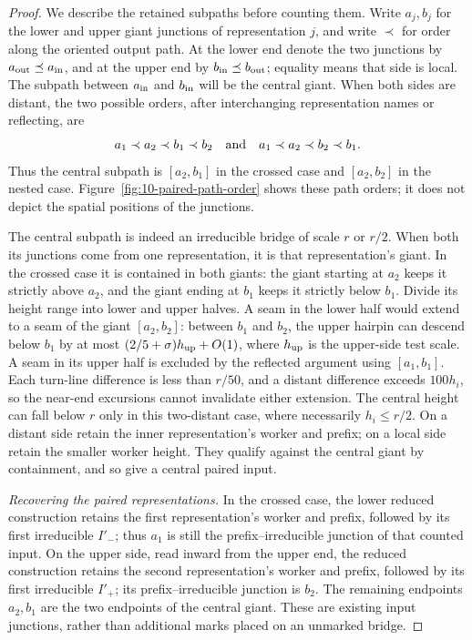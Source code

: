 \begin{proof}
We describe the retained subpaths before counting them. Write
\(a_j,b_j\) for the lower and upper giant junctions of representation
\(j\), and write \(\prec\) for order along the oriented output path.
At the lower end denote the two junctions by
\(a_{\rm out}\preceq a_{\rm in}\), and at the upper end by
\(b_{\rm in}\preceq b_{\rm out}\); equality means that side is local.
The subpath between \(a_{\rm in}\) and \(b_{\rm in}\) will be the
central giant. When both sides are distant, the two possible orders,
after interchanging representation names or reflecting, are
\[
 a_1\prec a_2\prec b_1\prec b_2
 \quad\hbox{and}\quad
 a_1\prec a_2\prec b_2\prec b_1.
\]
Thus the central subpath is \([a_2,b_1]\) in the crossed case and
\([a_2,b_2]\) in the nested case. Figure~\ref{fig:10-paired-path-order}
shows these path orders; it does not depict the spatial positions of
the junctions.


The central subpath is indeed an irreducible bridge of scale \(r\) or
\(r/2\). When both its junctions come from one representation, it is
that representation's giant. In the crossed case it is contained in
both giants: the giant starting at \(a_2\) keeps it strictly above
\(a_2\), and the giant ending at \(b_1\) keeps it strictly below
\(b_1\). Divide its height range into lower and upper halves.
A seam in the lower half would extend to a seam of the
giant \([a_2,b_2]\): between \(b_1\) and \(b_2\), the upper
hairpin can descend below \(b_1\) by at most
\((2/5+\sigma)h_{\rm up}+O(1)\), where \(h_{\rm up}\) is the
upper-side test scale. A seam in its upper half is
excluded by the reflected argument using \([a_1,b_1]\). Each turn-line
difference is less than \(r/50\), and a distant difference exceeds
\(100h_i\), so the near-end excursions cannot invalidate either
extension. The central height can fall below \(r\) only in this
two-distant case, where necessarily \(h_i\le r/2\). On a distant
side retain the inner representation's worker and prefix; on a local
side retain the smaller worker height. They qualify against the central
giant by containment, and so give a central paired input.

\smallskip\noindent\emph{Recovering the paired representations.}
In the crossed case, the lower reduced construction retains the first
representation's worker and prefix, followed by its first irreducible \(I'_-\); thus
\(a_1\) is still the prefix--irreducible junction of that counted
input. On the upper side, read inward from the upper end, the reduced
construction retains the second representation's worker and prefix,
followed by its first irreducible \(I'_+\); its prefix--irreducible
junction is \(b_2\). The remaining endpoints \(a_2,b_1\) are the two
endpoints of the central giant. These are existing input junctions,
rather than additional marks placed on an unmarked bridge.


\end{proof}
